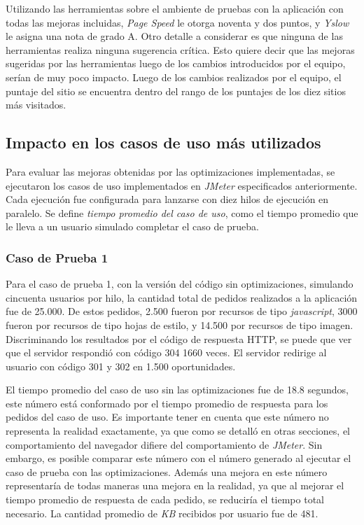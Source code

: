 Utilizando las herramientas sobre el ambiente de pruebas con la aplicación con todas las mejoras incluidas, \emph{Page Speed} le otorga noventa y dos puntos, y \emph{Yslow} le 
asigna una nota de grado A. Otro detalle a considerar es que ninguna de las herramientas realiza ninguna sugerencia crítica. Esto quiere decir que las mejoras sugeridas por las 
herramientas luego de los cambios introducidos por el equipo, serían de muy poco impacto. Luego de los cambios realizados por el equipo, el puntaje del sitio se encuentra dentro 
del rango de los puntajes de los diez sitios más visitados.

\subsection{Impacto en los casos de uso más utilizados}

Para evaluar las mejoras obtenidas por las optimizaciones implementadas, se ejecutaron los casos de uso implementados en \emph{JMeter} especificados anteriormente. Cada
ejecución fue configurada para lanzarse con diez hilos de ejecución en paralelo. Se define \emph{tiempo promedio del caso de uso}, como el tiempo promedio que le lleva a un 
usuario simulado completar el caso de prueba. 

\subsubsection{Caso de Prueba 1}

Para el caso de prueba 1, con la versión del código sin optimizaciones, simulando cincuenta usuarios por hilo, la cantidad total de pedidos realizados a la aplicación fue de
25.000. De estos pedidos, 2.500 fueron por recursos de tipo \emph{javascript}, 3000 fueron por recursos de tipo hojas de estilo, y 14.500
por recursos de tipo imagen. Discriminando los resultados por el código de respuesta HTTP, se puede que ver que el servidor respondió con código 304 1660
veces. El servidor redirige al usuario con código 301 y 302 en 1.500 oportunidades.

El tiempo promedio del caso de uso sin las optimizaciones fue de 18.8 segundos, este número está conformado por el tiempo promedio de respuesta para los 
pedidos del caso de uso. Es importante tener en cuenta que este número no representa la realidad exactamente, ya que como se detalló en otras secciones, el comportamiento del 
navegador difiere del comportamiento de \emph{JMeter}. Sin embargo, es posible comparar este número con el número generado al ejecutar el caso de prueba con las 
optimizaciones. Además una mejora en este número representaría de todas maneras una mejora en la realidad, ya que al mejorar el tiempo promedio de respuesta de cada pedido, se 
reduciría el tiempo total necesario. La cantidad promedio de \emph{KB} recibidos por usuario  fue de 481.

